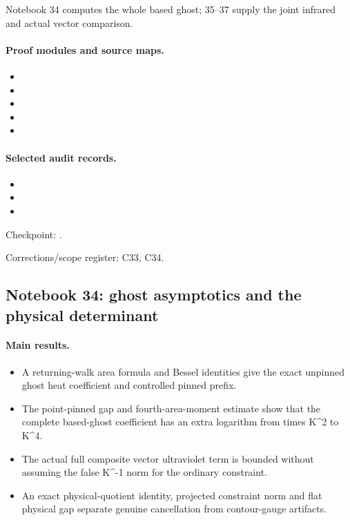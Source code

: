 \documentclass[11pt]{article}
\theoremstyle{remark}
\begin{document}
Notebook 34 computes the whole based ghost; 35--37 supply the joint infrared and actual vector comparison.

\paragraph{Proof modules and source maps.}
\begingroup\small
\begin{itemize}
\item {}
\item {}
\item {}
\item {}
\item {}
\end{itemize}
\endgroup

\paragraph{Selected audit records.}
\begingroup\small
\begin{itemize}
\item {}
\item {}
\item {}
\end{itemize}
\endgroup

Checkpoint: .\par
Corrections/scope register: C33, C34.\par

\subsection{Notebook 34: ghost asymptotics and the physical determinant}
\label{hnc-34}
\noindent{}\par

\paragraph{Main results.}
\begin{itemize}
\item A returning-walk area formula and Bessel identities give the exact unpinned ghost heat coefficient and controlled pinned prefix.
\item The point-pinned gap and fourth-area-moment estimate show that the complete based-ghost coefficient has an extra logarithm from times K\textasciicircum{}2 to K\textasciicircum{}4.
\item The actual full composite vector ultraviolet term is bounded without assuming the false K\textasciicircum{}-1 norm for the ordinary constraint.
\item An exact physical-quotient identity, projected constraint norm and flat physical gap separate genuine cancellation from contour-gauge artifacts.
\end{itemize}
\end{document}
